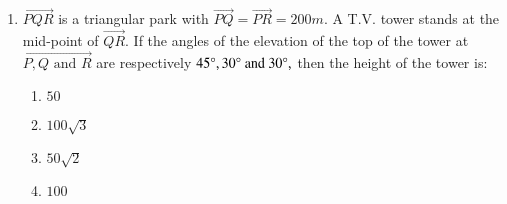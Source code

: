 \documentclass[journal]{IEEEtran}
\theoremstyle{remark}
\begin{document}
\begin{enumerate}[start=3]
\item $\vec{PQR}$ is a triangular park with $\vec{PQ}=\vec{PR}=200m$. A T.V. tower stands at the mid-point of $\vec{QR}$. If the angles of the elevation of the top of the tower at $\vec{P,Q \text{ and } R}$ are respectively $45\degree , 30\degree \text{ and } 30\degree,$ then the height of the tower  is: \hfill{}
\begin{multicols}{4}
\begin{enumerate}
        \item $50$                    
        \item $100\sqrt{3}$ 
        \item $50\sqrt{2}$ 
        \item $100$
\end{enumerate}
\end{multicols} 


\end{enumerate}
\end{document}
